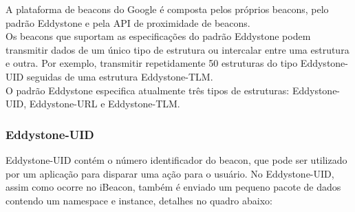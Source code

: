  \begin{figure}[h!]
 	\centering
\end{figure}

A plataforma de beacons do Google é composta pelos próprios beacons, pelo padrão Eddystone e pela API de proximidade de beacons. \\
\indent Os beacons que suportam as especificações do padrão Eddystone podem transmitir dados de um único tipo de estrutura ou intercalar entre uma estrutura e outra. Por exemplo, transmitir repetidamente 50 estruturas do tipo Eddystone-UID seguidas de uma estrutura Eddystone-TLM. \\
\indent O padrão Eddystone especifica atualmente três tipos de estruturas: Eddystone-UID, Eddystone-URL e Eddystone-TLM.

\subsubsection{Eddystone-UID}
\label{sec:eddystone-uid}

Eddystone-UID contém o número identificador do beacon, que pode ser utilizado por um aplicação para disparar uma ação para o usuário. No Eddystone-UID, assim como ocorre no iBeacon, também é enviado um pequeno pacote de dados contendo um namespace e instance, detalhes no quadro abaixo:

\begin{quadro}[h!]	
	\centering
\end{quadro}

